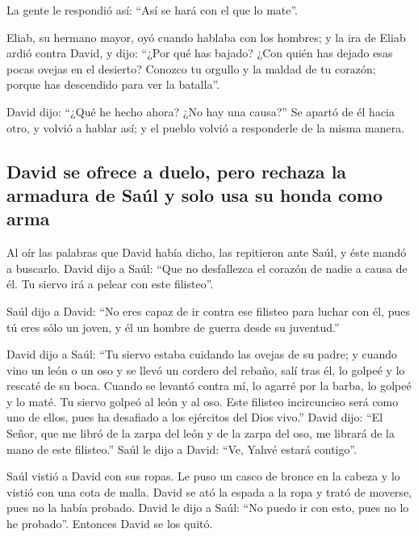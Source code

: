  La gente le respondió así: ``Así se hará con el que lo
mate''.

 Eliab, su hermano mayor, oyó cuando hablaba con los
hombres; y la ira de Eliab ardió contra David, y dijo: ``¿Por qué has
bajado? ¿Con quién has dejado esas pocas ovejas en el desierto? Conozco
tu orgullo y la maldad de tu corazón; porque has descendido para ver la
batalla''.

 David dijo: ``¿Qué he hecho ahora? ¿No hay una causa?''
 Se apartó de él hacia otro, y volvió a hablar así; y el
pueblo volvió a responderle de la misma manera.

\hypertarget{david-se-ofrece-a-duelo-pero-rechaza-la-armadura-de-sauxfal-y-solo-usa-su-honda-como-arma}{%
\subsection{David se ofrece a duelo, pero rechaza la armadura de Saúl y
solo usa su honda como
arma}\label{david-se-ofrece-a-duelo-pero-rechaza-la-armadura-de-sauxfal-y-solo-usa-su-honda-como-arma}}

 Al oír las palabras que David había dicho, las
repitieron ante Saúl, y éste mandó a buscarlo.  David
dijo a Saúl: ``Que no desfallezca el corazón de nadie a causa de él. Tu
siervo irá a pelear con este filisteo''.

 Saúl dijo a David: ``No eres capaz de ir contra ese
filisteo para luchar con él, pues tú eres sólo un joven, y él un hombre
de guerra desde su juventud.''

 David dijo a Saúl: ``Tu siervo estaba cuidando las
ovejas de su padre; y cuando vino un león o un oso y se llevó un cordero
del rebaño,  salí tras él, lo golpeé y lo rescaté de su
boca. Cuando se levantó contra mí, lo agarré por la barba, lo golpeé y
lo maté.  Tu siervo golpeó al león y al oso. Este
filisteo incircunciso será como uno de ellos, pues ha desafiado a los
ejércitos del Dios vivo.''  David dijo: ``El Señor, que
me libró de la zarpa del león y de la zarpa del oso, me librará de la
mano de este filisteo.'' Saúl le dijo a David: ``Ve, Yahvé estará
contigo''.

 Saúl vistió a David con sus ropas. Le puso un casco de
bronce en la cabeza y lo vistió con una cota de malla. 
David se ató la espada a la ropa y trató de moverse, pues no la había
probado. David le dijo a Saúl: ``No puedo ir con esto, pues no lo he
probado''. Entonces David se los quitó.

